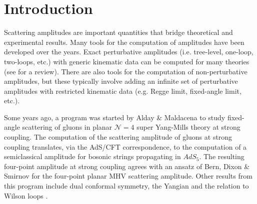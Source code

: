 \section{Introduction}
Scattering amplitudes are important quantities that bridge theoretical and experimental results. Many tools for the computation of amplitudes have been developed over the years. Exact perturbative amplitudes (i.e. tree-level, one-loop, two-loops, etc.) with generic kinematic data can be computed for many theories (see \cite{Elvang:2013cua} for a review). There are also tools for the computation of non-perturbative amplitudes, but these typically involve adding an infinite set of perturbative amplitudes with restricted kinematic data (e.g. Regge limit, fixed-angle limit, etc.).

Some years ago, a program was started by Alday \& Maldacena \cite{Alday:2007hr} to study fixed-angle scattering of gluons in planar $\mathcal{N} = 4$ super Yang-Mills theory at strong coupling. The computation of the scattering amplitude of gluons at strong coupling translates, via the AdS/CFT correspondence, to the computation of a semiclassical amplitude for bosonic strings propagating in $AdS_{5}$. The resulting four-point amplitude at strong coupling agrees with an ansatz of Bern, Dixon \& Smirnov \cite{Bern:2005iz} for the four-point planar MHV scattering amplitude. Other results from this program include dual conformal symmetry, the Yangian and the relation to Wilson loops \cite{Alday:2008yw,Drummond:2010km,Alday:2010kn}.

